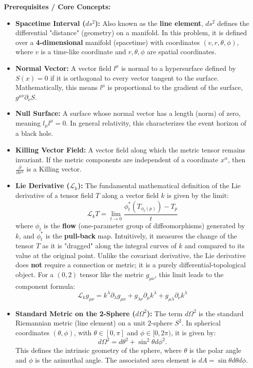 \begin{solution}
\textbf{Prerequisites / Core Concepts:}
\begin{itemize}
    \item \textbf{Spacetime Interval ($ds^2$):} Also known as the \textbf{line element}, $ds^2$ defines the differential "distance" (geometry) on a manifold. In this problem, it is defined over a \textbf{4-dimensional} manifold (spacetime) with coordinates $(v, r, \theta, \phi)$, where $v$ is a time-like coordinate and $r, \theta, \phi$ are spatial coordinates.
    \item \textbf{Normal Vector:} A vector field $l^\mu$ is normal to a hypersurface defined by $S(x) = 0$ if it is orthogonal to every vector tangent to the surface. Mathematically, this means $l^\mu$ is proportional to the gradient of the surface, $g^{\mu\nu}\partial_\nu S$.
    \item \textbf{Null Surface:} A surface whose normal vector has a length (norm) of zero, meaning $l_\mu l^\mu = 0$. In general relativity, this characterizes the event horizon of a black hole.
    \item \textbf{Killing Vector Field:} A vector field along which the metric tensor remains invariant. If the metric components are independent of a coordinate $x^\alpha$, then $\frac{\partial}{\partial x^\alpha}$ is a Killing vector.
    \item \textbf{Lie Derivative ($\mathcal{L}_k$):} The fundamental mathematical definition of the Lie derivative of a tensor field $T$ along a vector field $k$ is given by the limit:
    \[ \mathcal{L}_k T = \lim_{t \to 0} \frac{\phi_t^* (T_{\phi_t(p)}) - T_p}{t} \]
    where $\phi_t$ is the \textbf{flow} (one-parameter group of diffeomorphisms) generated by $k$, and $\phi_t^*$ is the \textbf{pull-back} map. Intuitively, it measures the change of the tensor $T$ as it is "dragged" along the integral curves of $k$ and compared to its value at the original point. Unlike the covariant derivative, the Lie derivative does \textbf{not} require a connection or metric; it is a purely differential-topological object. For a $(0,2)$ tensor like the metric $g_{\mu\nu}$, this limit leads to the component formula:
    \[ \mathcal{L}_k g_{\mu\nu} = k^\lambda \partial_\lambda g_{\mu\nu} + g_{\lambda\nu} \partial_\mu k^\lambda + g_{\mu\lambda} \partial_\nu k^\lambda \]
    \item \textbf{Standard Metric on the 2-Sphere ($d\Omega^2$):} The term $d\Omega^2$ is the standard Riemannian metric (line element) on a unit 2-sphere $S^2$. In spherical coordinates $(\theta, \phi)$, with $\theta \in [0, \pi]$ and $\phi \in [0, 2\pi)$, it is given by:
    \[ d\Omega^2 = d\theta^2 + \sin^2\theta d\phi^2. \]
    This defines the intrinsic geometry of the sphere, where $\theta$ is the polar angle and $\phi$ is the azimuthal angle. The associated area element is $dA = \sin\theta d\theta d\phi$.
\end{itemize}


\end{solution}
